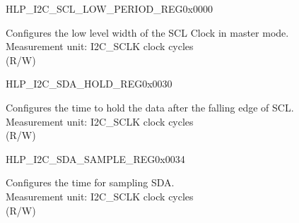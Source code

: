 \begin{register}{H}{LP\_I2C\_SCL\_LOW\_PERIOD\_REG}{0x0000}\label{regdesc:LPI2CSCLLOWPERIODREG}
    \regnewline%
    \begin{regdesc}\begin{reglist}
    \label{fielddesc:LPI2CSCLLOWPERIOD}\item [LP\_I2C\_SCL\_LOW\_PERIOD] Configures the low level width of the SCL Clock in master mode. \\
    Measurement unit: I2C\_SCLK clock cycles \\ (R/W)
    \end{reglist}\end{regdesc}
    \end{register}


    \begin{register}{H}{LP\_I2C\_SDA\_HOLD\_REG}{0x0030}\label{regdesc:LPI2CSDAHOLDREG}
    \regnewline%
    \begin{regdesc}\begin{reglist}
    \label{fielddesc:LPI2CSDAHOLDTIME}\item [LP\_I2C\_SDA\_HOLD\_TIME] Configures the time to hold the data after the falling edge of SCL.\\
    Measurement unit: I2C\_SCLK clock cycles \\ (R/W)
    \end{reglist}\end{regdesc}
    \end{register}


    \begin{register}{H}{LP\_I2C\_SDA\_SAMPLE\_REG}{0x0034}\label{regdesc:LPI2CSDASAMPLEREG}
    \regnewline%
    \begin{regdesc}\begin{reglist}
    \label{fielddesc:LPI2CSDASAMPLETIME}\item [LP\_I2C\_SDA\_SAMPLE\_TIME] Configures the time for sampling SDA.\\
    Measurement unit: I2C\_SCLK clock cycles \\ (R/W)
    \end{reglist}\end{regdesc}
    \end{register}


